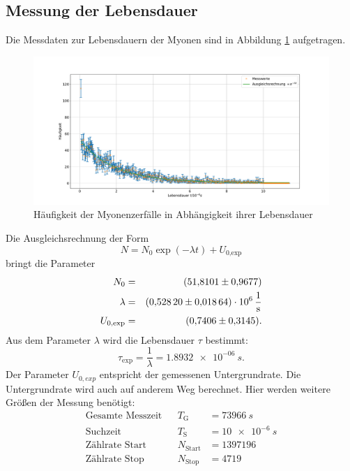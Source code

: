 \subsection{Messung der Lebensdauer}
Die Messdaten zur Lebensdauern der Myonen sind in Abbildung \ref{fig:myonen} aufgetragen.
\begin{figure}[h!]
  \centering
  \includegraphics[width=\textwidth]{figmyonen.pdf}
  \caption{Häufigkeit der Myonenzerfälle in Abhängigkeit ihrer Lebensdauer}
  \label{fig:myonen}
\end{figure}
Die Ausgleichsrechnung der Form
\begin{equation*}
  N = N_{0} \exp{(- \lambda t)}+U_{\text{0,exp}}
\end{equation*}
bringt die Parameter
\begin{align*}
  N_{0}              &=&  \SI{51.8101 \pm 0.9677}{}\\
  \lambda            &=&  \SI{0.5282 \pm 0.01864 e06}{\frac{1}{s}}\\
  U_{\text{0,exp}}   &=&  \SI{0.7406 \pm 0.3145}{}.\\
\end{align*}
Aus dem Parameter $\lambda$ wird die Lebensdauer $\tau$ bestimmt:
\begin{equation*}
  \tau_{\text{exp}}=\frac{1}{\lambda}=\SI{1.8932e-06}{s}.
\end{equation*}
Der Parameter $U_{0,exp}$ entspricht der gemessenen Untergrundrate.
Die Untergrundrate wird auch auf anderem Weg berechnet.
Hier werden weitere Größen der Messung benötigt:
\begin{align*}
  \text{Gesamte Messzeit}  && T_{\text{G}}      &=\SI{73966}{s} \\
  \text{Suchzeit}          && T_{\text{S}}      &=\SI{10e-6}{s} \\
  \text{Zählrate Start}    && N_{\text{Start}}  &=\SI{1397196}{} \\
  \text{Zählrate Stop}     && N_{\text{Stop}}   &=\SI{4719}{} \\
\end{align*}

